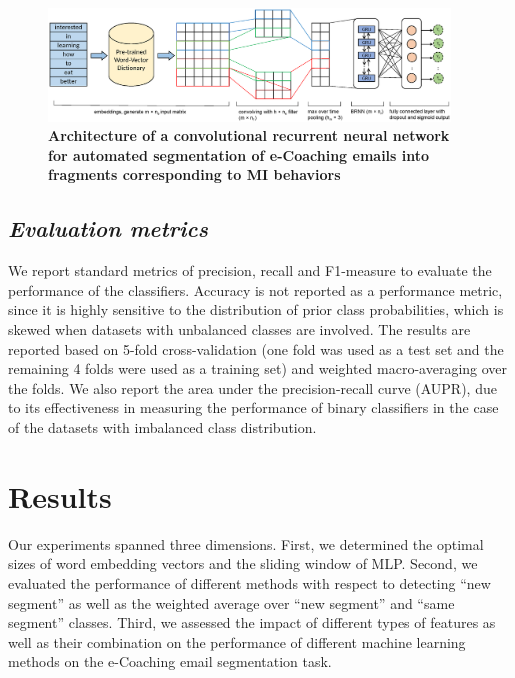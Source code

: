 \documentclass{amia}
\begin{document}
\begin{figure}[!htb]
    \centering
    \includegraphics[width=0.95\textwidth]{figures/CRNN.eps}
    \caption{\textbf{Architecture of a convolutional recurrent neural network for automated segmentation of e-Coaching emails into fragments corresponding to MI behaviors}}
    \label{fig:crnn}
\end{figure}
  
\subsection*{\textit{Evaluation metrics}}
We report standard metrics of precision, recall and F1-measure to evaluate the performance of the classifiers.\cite{aas1999text} Accuracy is not reported as a performance metric, since it is highly sensitive to the distribution of prior class probabilities, which is skewed when datasets with unbalanced classes are involved. The results are reported based on 5-fold cross-validation (one fold was used as a test set and the remaining 4 folds were used as a training set) and weighted macro-averaging over the folds. We also report the area under the precision-recall curve (AUPR), due to its effectiveness in measuring the performance of binary classifiers in the case of the datasets with imbalanced class distribution.\cite{davis2006relationship}

\section*{Results}
Our experiments spanned three dimensions. First, we determined the optimal sizes of word embedding vectors and the sliding window of MLP. Second, we evaluated the performance of different methods with respect to detecting ``new segment'' as well as the weighted average over ``new segment'' and ``same segment'' classes. Third, we assessed the impact of different types of features as well as their combination on the performance of different machine learning methods on the e-Coaching email segmentation task.
\end{document}
